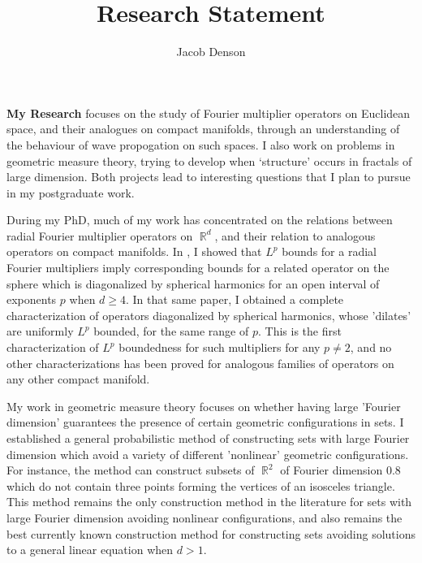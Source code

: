 \documentclass[12pt]{article}
\title{Research Statement}
\author{Jacob Denson}
\date{}
\DeclareMathOperator{\RR}{\mathbb{R}}
\begin{document}
\maketitle

{\bf My Research} focuses on the study of Fourier multiplier operators on Euclidean space, and their analogues on compact manifolds, through an understanding of the behaviour of wave propogation on such spaces. I also work on problems in geometric measure theory, trying to develop when `structure' occurs in fractals of large dimension. Both projects lead to interesting questions that I plan to pursue in my postgraduate work.

During my PhD, much of my work has concentrated on the relations between radial Fourier multiplier operators on $\RR^d$, and their relation to analogous operators on compact manifolds. In \cite{DensonCharacterization}, I showed that $L^p$ bounds for a radial Fourier multipliers imply corresponding bounds for a related operator on the sphere which is diagonalized by spherical harmonics for an open interval of exponents $p$ when $d \geq 4$. In that same paper, I obtained a complete characterization of operators diagonalized by spherical harmonics, whose 'dilates' are uniformly $L^p$ bounded, for the same range of $p$. This is the first characterization of $L^p$ boundedness for such multipliers for any $p \neq 2$, and no other characterizations has been proved for analogous families of operators on any other compact manifold.

My work in geometric measure theory focuses on whether having large 'Fourier dimension' guarantees the presence of certain geometric configurations in sets. I established a general probabilistic method of constructing sets with large Fourier dimension which avoid a variety of different 'nonlinear' geometric configurations. For instance, the method can construct subsets of $\RR^2$ of Fourier dimension $0.8$ which do not contain three points forming the vertices of an isosceles triangle. This method remains the only construction method in the literature for sets with large Fourier dimension avoiding nonlinear configurations, and also remains the best currently known construction method for constructing sets avoiding solutions to a general linear equation when $d > 1$.
\end{document}
